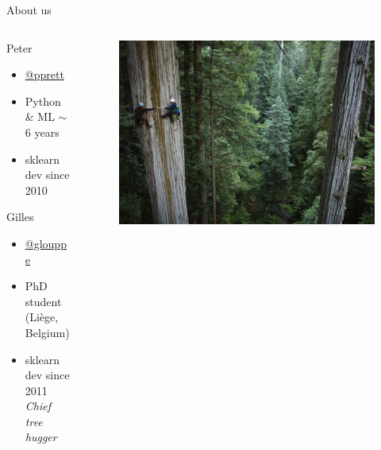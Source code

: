 \documentclass[a4paper,presentation]{beamer}
\begin{document}
\begin{frame}{About us}
\begin{columns}[t]

\begin{column}[T]{0.5\textwidth}
\begin{block}{Peter}
    \begin{itemize}
      \item \href{https://twitter.com/pprett}{@pprett}
      \item Python \& ML $\sim$ 6 years
      \item sklearn dev since 2010
    \end{itemize}
\end{block}
\begin{block}{Gilles}
    \begin{itemize}
      \item \href{https://twitter.com/glouppe}{@glouppe}
      \item PhD student (Liège, Belgium)
      \item sklearn dev since 2011\\
        \textit{Chief tree hugger}
    \end{itemize}
\end{block}
\end{column}

\begin{column}[T]{0.45\textwidth}

\begin{figure}
  \centering
    \vspace{-1cm}
    \includegraphics[scale=0.3]{./images/tree-climbers.jpg}
\end{figure}
\end{column}
\end{columns}
\end{frame}
\end{document}
